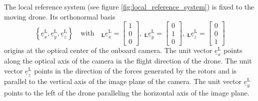 The local reference system (see figure \ref{fig:local_reference_system}) is fixed to the moving drone.
Its orthonormal basis
\begin{equation}
    \left\{
        \underline e^\text{L}_x,
        \underline e^\text{L}_y,
        \underline e^\text{L}_z
    \right\}
    \quad\text{with}\quad 
    {}_\textbf{L}\underline e^\text{L}_x 
    = 
    \begin{bmatrix}
        1 \\ 0 \\ 0
    \end{bmatrix}
    ,\ 
    {}_\textbf{L}\underline e^\text{L}_y 
    = 
    \begin{bmatrix}
        0 \\ 1 \\ 0
    \end{bmatrix}
    ,\ 
    {}_\textbf{L}\underline e^\text{L}_z 
        = 
        \begin{bmatrix}
            0 \\ 0 \\ 1
        \end{bmatrix}
\end{equation}
origins at the optical center of the onboard camera.
The unit vector 
$
    \underline e^\text{L}_x
$ 
points along the optical axis of the camera
in the flight direction of the drone.
The unit vector
$
    \underline e^\text{L}_z
$
points in the direction of the forces generated by the rotors
and is parallel to the vertical axis of the image plane of the camera.
The unit vector 
$
    \underline e^\text{L}_y
$
points to the left of the drone
paralleling the horizontal axis of the image plane.







